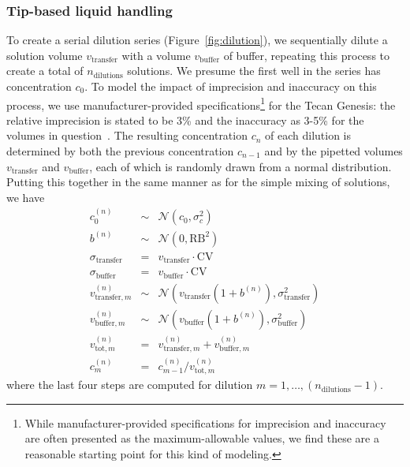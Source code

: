 \documentclass[aps,pre,twocolumn,nofootinbib,superscriptaddress,linenumbers]{revtex4-1}
\begin{document}
\subsubsection*{Tip-based liquid handling}

To create a serial dilution series (Figure~\ref{fig:dilution}), we sequentially dilute a solution volume $v_\mathrm{transfer}$ with a volume $v_\mathrm{buffer}$ of buffer, repeating this process to create a total of $n_\mathrm{dilutions}$ solutions. 
We presume the first well in the series has concentration $c_0$.
To model the impact of imprecision and inaccuracy on this process, we use manufacturer-provided specifications\footnote{While manufacturer-provided specifications for imprecision and inaccuracy are often presented as the maximum-allowable values, we find these are a reasonable starting point for this kind of modeling.} for the Tecan Genesis: the relative imprecision is stated to be 3\% and the inaccuracy as 3-5\% for the volumes in question~\cite{_tecan_2001}. 
The resulting concentration $c_n$ of each dilution is determined by both the previous concentration $c_{n-1}$  and by the pipetted volumes $v_\mathrm{transfer}$ and $v_\mathrm{buffer}$, each of which is randomly drawn from a normal distribution.
Putting this together in the same manner as for the simple mixing of solutions, we have
\begin{eqnarray}
c_0^{(n)} &\sim& \mathcal{N}(c_0, \sigma_c^2) \nonumber \label{equation:stock-concentration-uncertainty-simple} \\
b^{(n)} &\sim& \mathcal{N}(0, \mathrm{RB}^2) \nonumber \\
\sigma_\mathrm{transfer} &=& v_\mathrm{transfer} \cdot \mathrm{CV} \nonumber \\
\sigma_\mathrm{buffer} &=& v_\mathrm{buffer} \cdot \mathrm{CV} \nonumber \\
v_{\mathrm{transfer},m}^{(n)} &\sim& \mathcal{N}(v_\mathrm{transfer} (1 + b^{(n)}) , \sigma_\mathrm{transfer}^2) \nonumber \\
v_{\mathrm{buffer},m}^{(n)} &\sim& \mathcal{N}(v_\mathrm{buffer} (1 + b^{(n)}), \sigma_\mathrm{buffer}^2) \nonumber \\
v_{\mathrm{tot}, m}^{(n)} &=& v_{\mathrm{transfer}, m}^{(n)} + v_{\mathrm{buffer}, m}^{(n)} \nonumber \\
c_m^{(n)} &=& c_{m-1}^{(n)} / v_{\mathrm{tot}, m}^{(n)}
\end{eqnarray}
where the last four steps are computed for dilution $m = 1, \ldots, (n_\mathrm{dilutions}-1)$.
\end{document}
